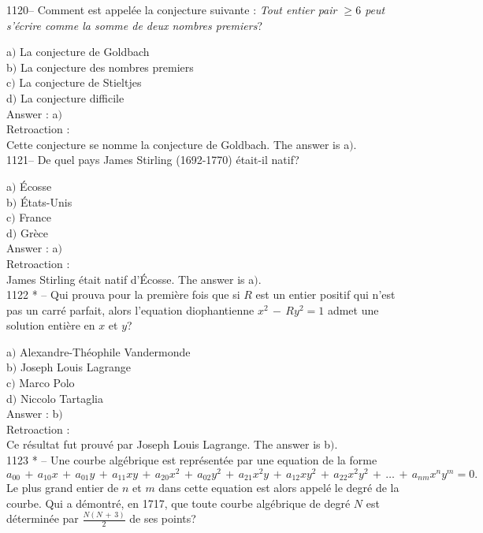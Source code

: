 ﻿\documentclass[letterpaper, 12pt]{article}
\begin{document}
1120-- Comment est appel\'ee la conjecture suivante : {\sl Tout
entier pair $\ge6$ peut s'\'ecrire comme la somme de deux nombres
premiers}?

a$)$ La conjecture de Goldbach \\
b$)$ La conjecture des nombres premiers  \\
c$)$ La conjecture de Stieltjes \\
d$)$ La conjecture difficile \\

Answer : a$)$\\

Retroaction : \\
Cette conjecture se nomme la conjecture de Goldbach.
The answer is a$)$.\\

1121-- De quel pays James Stirling (1692-1770) \'etait-il natif?

a$)$ \'Ecosse \\
b$)$ \'Etats-Unis \\
c$)$ France  \\
d$)$ Gr\`ece   \\

Answer : a$)$\\

Retroaction : \\
James Stirling \'etait natif d'\'Ecosse.
The answer is a$)$.\\


1122 * -- Qui prouva pour la premi\`ere fois que si $R$ est un
entier positif qui n'est pas un carr\'e parfait, alors l'equation
diophantienne $x^2\,-\,Ry^2=1$ admet une solution enti\`ere en $x$
et $y$?

a$)$ Alexandre-Th\'eophile Vandermonde \\
b$)$ Joseph Louis Lagrange \\
c$)$ Marco Polo \\
d$)$ Niccolo Tartaglia \\

Answer : b$)$\\

Retroaction : \\
Ce r\'esultat fut prouv\'e par Joseph Louis Lagrange.
The answer is b$)$.\\


1123 * -- Une courbe alg\'ebrique est repr\'esent\'ee par une
equation de la forme
$$a_{00}\,+\,a_{10}x\,+\,a_{01}y\,+\,a_{11}xy\,+\,a_{20}x^2\,+\,a_{02}y^2\,+\,a_{21}x^2y\,+\,a_{12}xy^2\,+\,a_{22}x^2y^2\,+\,\ldots\,+\,a_{nm}x^ny^m=0.$$
Le plus grand entier de $n$ et $m$ dans cette equation est alors
appel\'e le degr\'e de la courbe. Qui a d\'emontr\'e, en 1717, que
toute courbe alg\'ebrique de degr\'e $N$ est d\'etermin\'ee par
$\frac{N(N\,+\,3)}2$ de ses points?
\end{document}
